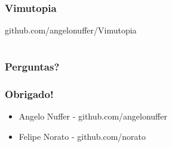 \documentclass[]{beamer}
\begin{document}
\section[Vimutopia]{}

\begin{frame}
    \frametitle{Vimutopia}
             github.com/angelonuffer/Vimutopia
    \begin{center}
    \end{center}
\end{frame} 

\section[Perguntas?]{}

\begin{frame}
    \frametitle{Perguntas?}
    \begin{center}
    \end{center}
\end{frame}

\begin{frame}
    \frametitle{Obrigado!}
    \begin{itemize}
      \item Angelo Nuffer - github.com/angelonuffer
      \item Felipe Norato - github.com/norato
    \end{itemize}
\end{frame}
\end{document}
